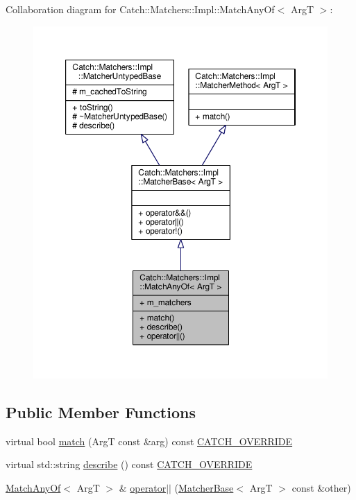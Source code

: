Collaboration diagram for Catch\-:\-:Matchers\-:\-:Impl\-:\-:Match\-Any\-Of$<$ Arg\-T $>$\-:
\nopagebreak
\begin{figure}[H]
\begin{center}
\leavevmode
\includegraphics[width=350pt]{struct_catch_1_1_matchers_1_1_impl_1_1_match_any_of__coll__graph}
\end{center}
\end{figure}
\subsection*{Public Member Functions}
\begin{DoxyCompactItemize}
\item 
virtual bool \hyperlink{struct_catch_1_1_matchers_1_1_impl_1_1_match_any_of_a73be317ecf5919af855af96d68e714b9}{match} (Arg\-T const \&arg) const \hyperlink{catch_8hpp_a8ecdce4d3f57835f707915ae831eb847}{C\-A\-T\-C\-H\-\_\-\-O\-V\-E\-R\-R\-I\-D\-E}
\item 
virtual std\-::string \hyperlink{struct_catch_1_1_matchers_1_1_impl_1_1_match_any_of_a020f5d7889d8cd8be9ad309c690147b6}{describe} () const \hyperlink{catch_8hpp_a8ecdce4d3f57835f707915ae831eb847}{C\-A\-T\-C\-H\-\_\-\-O\-V\-E\-R\-R\-I\-D\-E}
\item 
\hyperlink{struct_catch_1_1_matchers_1_1_impl_1_1_match_any_of}{Match\-Any\-Of}$<$ Arg\-T $>$ \& \hyperlink{struct_catch_1_1_matchers_1_1_impl_1_1_match_any_of_a44d7582dbe09fc31b9a5ba8a6367b506}{operator$\vert$$\vert$} (\hyperlink{struct_catch_1_1_matchers_1_1_impl_1_1_matcher_base}{Matcher\-Base}$<$ Arg\-T $>$ const \&other)
\end{DoxyCompactItemize}
